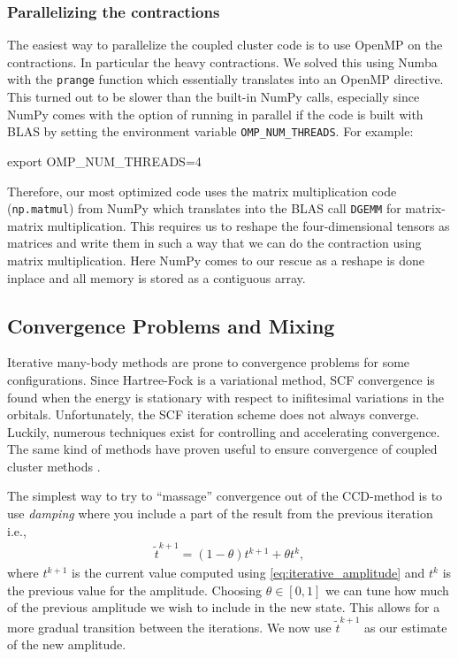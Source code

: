 \documentclass[
    a4paper, aps, twocolumn, floatfix, superscriptaddress,
    nofootinbib]{revtex4-1}
\newcommand{\1}{\mathds{1}}
\begin{document}
        \subsubsection{Parallelizing the contractions}
            The easiest way to parallelize the coupled cluster code is to use
            OpenMP on the contractions. In particular the heavy contractions. We
            solved this using Numba with the \texttt{prange} function which
            essentially translates into an OpenMP directive. This turned out to
            be slower than the built-in NumPy calls, especially since NumPy
            comes with the option of running in parallel if the code is built
            with BLAS by setting the environment variable
            \texttt{OMP\_NUM\_THREADS}. For example:
            \begin{bash}
                export OMP_NUM_THREADS=4
            \end{bash}

            Therefore, our most optimized code uses the matrix multiplication
            code (\texttt{np.matmul}) from NumPy which translates into the BLAS
            call \texttt{DGEMM} for matrix-matrix multiplication. This requires
            us to reshape the four-dimensional tensors as matrices and write
            them in such a way that we can do the contraction using matrix
            multiplication. Here NumPy comes to our rescue as a reshape is done
            inplace and all memory is stored as a contiguous array.

    \subsection{Convergence Problems and Mixing}

        Iterative many-body methods are prone to convergence problems for some
        configurations. Since Hartree-Fock is a variational method, SCF convergence
        is found when the energy is stationary with respect to inifitesimal
        variations in the orbitals. Unfortunately, the SCF iteration scheme does
        not always converge. Luckily, numerous techniques exist for controlling
        and accelerating convergence\cite{schlegel1991you}. The same kind of
        methods have proven useful to ensure convergence of coupled cluster methods
        \cite{scuseria1986accelerating}.

        The simplest way to try to ``massage'' convergence out of the CCD-method
        is to use \emph{damping} where you include a part of the result from the
        previous iteration i.e.,
        \begin{align}
            \tilde{t}^{k + 1} = (1 - \theta) t^{k + 1} + \theta t^k,
            \label{eq:mixing}
        \end{align}
        where $t^{k + 1}$ is the current value computed using
        \autoref{eq:iterative_amplitude} and $t^k$ is the previous value for the
        amplitude. Choosing $\theta \in [0, 1]$ we can tune how much of the
        previous amplitude we wish to include in the new state. This allows for
        a more gradual transition between the iterations. We now use
        $\tilde{t}^{k + 1}$ as our estimate of the new amplitude.
\end{document}
